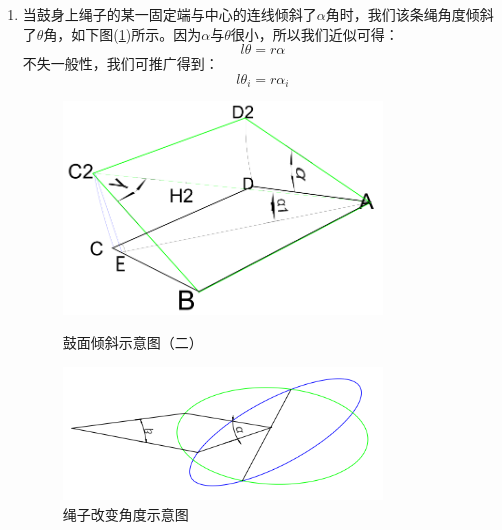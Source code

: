\documentclass{cumcm}
\begin{document}
\begin{enumerate}
\item 当鼓身上绳子的某一固定端与中心的连线倾斜了$\alpha$角时，我们该条绳角度倾斜了$\theta$角，如下图(\ref{fig:angel})所示。因为$\alpha$与$\theta$很小，所以我们近似可得：
\begin{displaymath}
l\theta=r\alpha
\end{displaymath}
不失一般性，我们可推广得到：
\begin{equation}
l\theta_i=r\alpha_i
\end{equation}
\begin{figure}[H]
  \begin{minipage}[t]{0.5\linewidth}   
    \centering   
    \includegraphics[width=0.8\textwidth]{img/change.png}   
    \caption{鼓面倾斜示意图（二）}   
    \label{fig:change}   
  \end{minipage}   
   \begin{minipage}[t]{0.5\linewidth} %
      \centering   
      \includegraphics[width=0.8\textwidth]{img/angel.png}   
      \caption{绳子改变角度示意图}   
      \label{fig:angel}   
    \end{minipage} 
\end{figure}


\end{enumerate}
\end{document}
